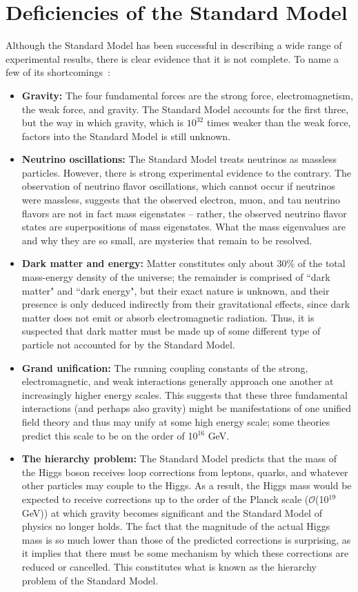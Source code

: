 \section{Deficiencies of the Standard Model\label{sec:SMdeficiencies}}

Although the Standard Model has been successful in describing a wide range of experimental results, there is clear evidence that it is not complete. To name a few of its shortcomings~\cite{BettiniPhysics}:

\begin{itemize}
\item \textbf{Gravity: }The four fundamental forces are the strong force, electromagnetism, the weak force, and gravity. The Standard Model accounts for the first three, but the way in which gravity, which is $10^{32}$ times weaker than the weak force, factors into the Standard Model is still unknown.
\item \textbf{Neutrino oscillations: }The Standard Model treats neutrinos as massless particles. However, there is strong experimental evidence to the contrary. The observation of neutrino flavor oscillations, which cannot occur if neutrinos were massless, suggests that the observed electron, muon, and tau neutrino flavors are not in fact mass eigenstates -- rather, the observed neutrino flavor states are superpositions of mass eigenstates. What the mass eigenvalues are and why they are so small, are mysteries that remain to be resolved.
\item \textbf{Dark matter and energy: }Matter constitutes only about 30\% of the total mass-energy density of the universe; the remainder is comprised of ``dark matter" and ``dark energy", but their exact nature is unknown, and their presence is only deduced indirectly from their gravitational effects, since dark matter does not emit or absorb electromagnetic radiation. Thus, it is suspected that dark matter must be made up of some different type of particle not accounted for by the Standard Model.
\item \textbf{Grand unification: }The running coupling constants of the strong, electromagnetic, and weak interactions generally approach one another at increasingly higher energy scales. This suggests that these three fundamental interactions (and perhaps also gravity) might be manifestations of one unified field theory and thus may unify at some high energy scale; some theories predict this scale to be on the order of 10$^{16}$ GeV.
\item \textbf{The hierarchy problem: }The Standard Model predicts that the mass of the Higgs boson receives loop corrections from leptons, quarks, and whatever other particles may couple to the Higgs. As a result, the Higgs mass would be expected to receive corrections up to the order of the Planck scale ($\mathcal{O}$(10$^{19}$ GeV)) at which gravity becomes significant and the Standard Model of physics no longer holds. The fact that the magnitude of the actual Higgs mass is so much lower than those of the predicted corrections is surprising, as it implies that there must be some mechanism by which these corrections are reduced or cancelled. This constitutes what is known as the hierarchy problem of the Standard Model.
\end{itemize}

